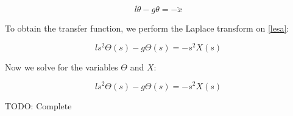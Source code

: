 \begin{equation} \label{lesa}
	l\ddot{\theta}-g\theta=-\ddot{x}
\end{equation}

To obtain the transfer function, we perform the Laplace transform on \ref{lesa}:

\begin{equation} \label{ltsa}
	ls^2\Theta(s)-g\Theta(s)=-s^2X(s)
\end{equation}

Now we solve for the variables $\Theta$ and $X$:

\begin{equation} \label{tfsa}
	ls^2\Theta(s)-g\Theta(s)=-s^2X(s)
\end{equation}

TODO: Complete
